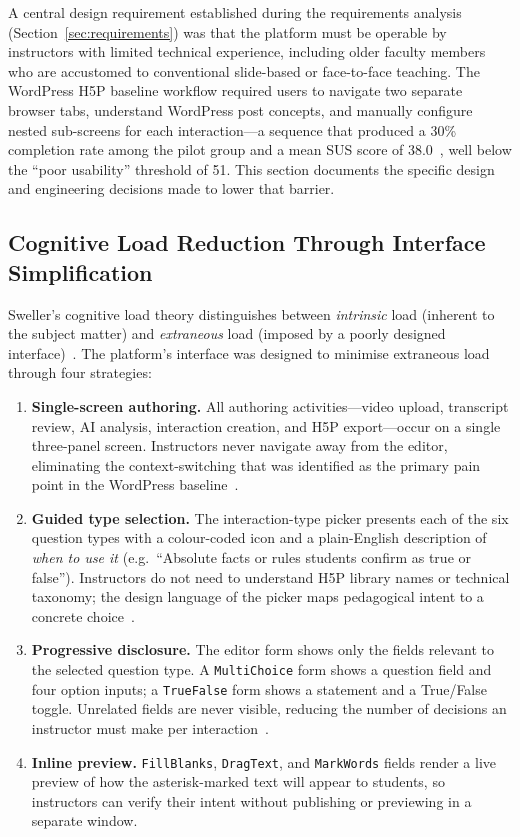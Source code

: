 A central design requirement established during the requirements analysis
(Section~\ref{sec:requirements}) was that the platform must be operable by
instructors with limited technical experience, including older faculty members
who are accustomed to conventional slide-based or face-to-face teaching.
The WordPress H5P baseline workflow required users to navigate two separate
browser tabs, understand WordPress post concepts, and manually configure nested
sub-screens for each interaction---a sequence that produced a 30\% completion
rate among the pilot group and a mean SUS score of 38.0~\cite{brooke1996},
well below the ``poor usability'' threshold of 51. This section documents the
specific design and engineering decisions made to lower that barrier.

\subsection{Cognitive Load Reduction Through Interface Simplification}

Sweller's cognitive load theory distinguishes between \emph{intrinsic} load
(inherent to the subject matter) and \emph{extraneous} load (imposed by a
poorly designed interface)~\cite{sweller1988}. The platform's interface was
designed to minimise extraneous load through four strategies:

\begin{enumerate}
  \item \textbf{Single-screen authoring.} All authoring activities---video
  upload, transcript review, AI analysis, interaction creation, and H5P
  export---occur on a single three-panel screen. Instructors never navigate
  away from the editor, eliminating the context-switching that was identified
  as the primary pain point in the WordPress baseline~\cite{chandler1991}.

  \item \textbf{Guided type selection.} The interaction-type picker presents
  each of the six question types with a colour-coded icon and a plain-English
  description of \emph{when to use it} (e.g.\ ``Absolute facts or rules
  students confirm as true or false''). Instructors do not need to understand
  H5P library names or technical taxonomy; the design language of the picker
  maps pedagogical intent to a concrete choice~\cite{norman1988}.

  \item \textbf{Progressive disclosure.} The editor form shows only the fields
  relevant to the selected question type. A \texttt{MultiChoice} form shows a
  question field and four option inputs; a \texttt{TrueFalse} form shows a
  statement and a True/False toggle. Unrelated fields are never visible,
  reducing the number of decisions an instructor must make per
  interaction~\cite{nielsen1994}.

  \item \textbf{Inline preview.} \texttt{FillBlanks}, \texttt{DragText}, and
  \texttt{MarkWords} fields render a live preview of how the asterisk-marked
  text will appear to students, so instructors can verify their intent without
  publishing or previewing in a separate window.
\end{enumerate}

